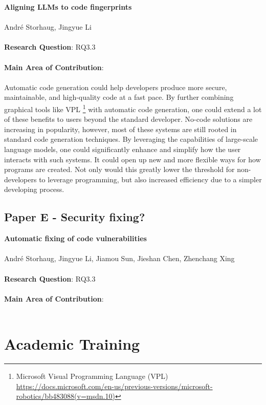 \documentclass[12pt]{book}
\begin{document}
\textbf{Aligning LLMs to code fingerprints}\\\\
\noindent Andr\'e Storhaug, Jingyue Li\\\\
\noindent \textbf{Research Question}: RQ3.3\\\\
\noindent \textbf{Main Area of Contribution}: \\\\

Automatic code generation could help developers produce more secure, maintainable, and high-quality code at a fast pace. By further combining graphical tools like VPL \footnote{Microsoft Visual Programming Language (VPL) \url{https://docs.microsoft.com/en-us/previous-versions/microsoft-robotics/bb483088(v=msdn.10)}} with automatic code generation, one could extend a lot of these benefits to users beyond the standard developer.  No-code solutions are increasing in popularity, however, most of these systems are still rooted in standard code generation techniques. By leveraging the capabilities of large-scale language models, one could significantly enhance and simplify how the user interacts with such systems. It could open up new and more flexible ways for how programs are created. Not only would this greatly lower the threshold for non-developers to leverage programming, but also increased efficiency due to a simpler developing process.


\subsection{Paper E - Security fixing?}

\textbf{Automatic fixing of code vulnerabilities}\\\\
\noindent Andr\'e Storhaug, Jingyue Li, Jiamou Sun, Jieshan Chen, Zhenchang Xing\\\\
\noindent \textbf{Research Question}: RQ3.3\\\\
\noindent \textbf{Main Area of Contribution}: \\\\



\section{Academic Training}
\end{document}
